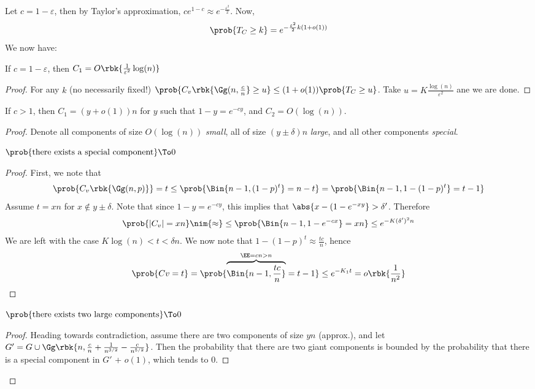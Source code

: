 \documentclass[a4paper, 11pt, oneside]{book}
\begin{document}
	Let $c = 1-\varepsilon$, then by Taylor's approximation, $ce^{1-c}\approx e^{-\frac{\varepsilon^2}{2}}$. Now,
	\[
	\prob{T_C \ge k} =e^{-\frac{\varepsilon^2}{2}k(1+o(1))}
	\]
	We now have:
	\begin{claim}
		If $c = 1-\varepsilon$, then $C_1 = O\rbk{\frac{1}{\varepsilon^2}\log(n)}$
	\end{claim}
	\begin{proof} For any $k$ (no necessarily fixed!)
		$\prob{C_v\rbk{\Gg(n,\frac{c}{n}}\ge u}\le (1+o(1)) \prob{T_C \ge u}$. Take $u = K\frac{\log(n)}{\varepsilon^2}$ ane we are done.
	\end{proof}
	\begin{claim}
		If $c>1$, then $C_1 = (y+o(1))n$ for $y$ such that $1-y = e^{-cy}$, and $C_2 = O(\log(n))$.
	\end{claim}
	\begin{proof}
		Denote all components of size $O(\log(n))$ \emph{small}, all of size $(y\pm\delta)n$ \emph{large}, and all other components \emph{special}.
		\begin{prop}
			$\prob{\text{there exists a special component}}\To 0$
		\end{prop}
		\begin{proof}
			First, we note that $$\prob{C_v\rbk{\Gg(n,p)}} = t \le \prob{\Bin{n-1,(1-p)^t} = n-t} = \prob{\Bin{n-1, 1-(1-p)^t} = t-1}$$
			Assume $t = xn$ for $x\notin y\pm\delta$. Note that since $1-y = e^{-cy}$, this implies that $\abs{x-(1-e^{-xy}} > \delta'$. Therefore
			\begin{align*}
				\prob{|C_v| = xn} \nim{\approx}\leq \prob{\Bin{n-1,1-e^{-cx}} = xn}\le e^{-K(\delta')^2n}
			\end{align*}
			We are left with the case $K\log(n) < t < \delta n$. We now note that $1-(1-p)^t \approx \frac{tc}{n}$, hence
			\[
			\prob{Cv = t} = \prob{\overbrace{\Bin{n-1,\frac{tc}{n}}}^{\EE = cn > n} = t-1}\le e^{-K_1t} = o\rbk{\frac{1}{n^2}}
			\]
		\end{proof}
		\begin{prop}
			$\prob{\text{there exists two large components}}\To 0$
		\end{prop}
		\begin{proof} Heading towards contradiction, assume there are two components of size $yn$ (approx.), and let $G' = G \cup \Gg\rbk{n,\frac{c}{n}+\frac{1}{n^{3/2}} - \frac{c}{n^{5/2}}}$. Then the probability that there are two giant components is bounded by the probability that there is a special component in $G'$ + $o(1)$, which tends to $0$.
		\end{proof}

\end{proof}
\end{document}
